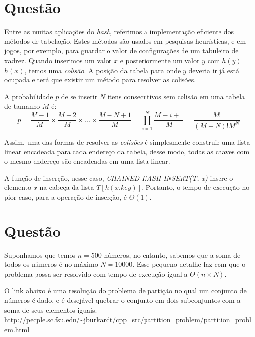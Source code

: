 \documentclass[a4paper,12pt]{article}
\begin{document}
\section{Questão}
Entre as muitas aplicações do \textit{hash}, referimos a implementação eficiente dos métodos de tabelação. Estes métodos são usados em pesquisas heurísticas, e em jogos, por exemplo, para guardar o valor de configurações de um tabuleiro de xadrez.
Quando inserimos um valor $x$ e posteriormente um valor $y$ com $h(y)$ = $h(x)$, temos uma \textit{colisão}. A posição da tabela para onde $y$ deveria ir já está ocupada e terá que existir um método para resolver as colisões.

A probabilidade $p$ de se inserir $N$ itens consecutivos sem colisão em uma tabela de tamanho $M$ é:
	$$
	p = \frac{M-1}{M}\times\frac{M-2}{M}\times...\times\frac{M-N+1}{M} = \prod \limits_{i=1}^N \frac{M-i+1}{M} = \frac{M!}{(M-N)!M^N}
	$$

Assim, uma das formas de resolver as \textit{colisões} é simplesmente construir uma lista linear encadeada para cada endereço da tabela, desse modo, todas as chaves com o mesmo endereço são encadeadas em uma lista linear.

A função de inserção, nesse caso, \textit{CHAINED-HASH-INSERT(T, x)} insere o elemento $x$ na cabeça da lista $T[h(x.key)]$. Portanto, o tempo de execução no pior caso, para a operação de inserção, é $\Theta(1)$.

\section{Questão}


Suponhamos que temos $n = 500$ números, no entanto, sabemos que a soma de todos os números é no máximo $N = 10000$. Esse pequeno detalhe faz com que o problema possa ser resolvido com tempo de execução igual a $\Theta(n\times N)$.

O link abaixo é uma resolução do problema de partição no qual um conjunto de números é dado, e é desejável quebrar o conjunto em dois subconjuntos com a soma de seus elementos iguais.\\
\url{http://people.sc.fsu.edu/~jburkardt/cpp_src/partition_problem/partition_problem.html}
\end{document}
